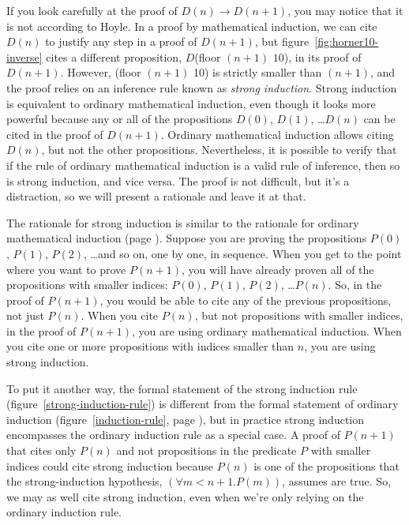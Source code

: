 If you look carefully at the proof of $D(n) \rightarrow D(n+1)$,
you may notice that it is not according to Hoyle.
In a proof by mathematical induction,
we can cite $D(n)$ to justify any step in a proof of $D(n+1)$,
but figure~\ref{fig:horner10-inverse} cites a different
proposition, $D$\textsf{(floor $(n+1)$ $10$)},
in its proof of $D(n+1)$.
However, \textsf{(floor $(n+1)$ 10)}
is strictly smaller than $(n+1)$, and
the proof relies on an inference rule
known as \emph{strong induction}.
Strong induction is equivalent to ordinary mathematical induction,
even though it looks more powerful because any or all of the
propositions $D(0)$, $D(1)$, \dots $D(n)$ can be cited in the proof of $D(n+1)$.
Ordinary mathematical induction allows citing $D(n)$, but not the other
propositions.
Nevertheless, it is possible to verify
that if the rule of ordinary mathematical induction
is a valid rule of inference, then so is strong induction, and vice versa.
The proof is not difficult, but it's a distraction,
so we will present a rationale and leave it at that.

\label{strong-induction-rationale}The rationale for
strong induction is similar to
the rationale for ordinary mathematical induction (page \pageref{induction-rationale}).
Suppose you are proving the propositions
$P(0)$, $P(1)$, $P(2)$, \dots and so on,
one by one, in sequence.
When you get to the point where you want to prove $P(n+1)$,
you will have already proven all of the propositions
with smaller indices:
$P(0)$, $P(1)$, $P(2)$, \dots $P(n)$.
So, in the proof of $P(n+1)$, you would be able to
cite any of the previous propositions, not just $P(n)$.
When you cite $P(n)$, but not propositions with smaller indices,
in the proof of $P(n+1)$, you are using ordinary mathematical induction.
When you cite one or more propositions with indices smaller than $n$,
you are using strong induction.

To put it another way, the formal statement of the strong induction rule
(figure~\ref{strong-induction-rule}) %
is different from the formal statement of ordinary induction
(figure~\ref{induction-rule}, page \pageref{induction-rule}), but
in practice strong induction encompasses the ordinary induction rule
as a special case. A proof of $P(n+1)$ that cites only $P(n)$
and not propositions in the predicate $P$ with smaller indices
could cite strong induction because $P(n)$ is one of the propositions
that the strong-induction
hypothesis, $(\forall m<n+1.P(m))$, assumes are true.
So, we may as well cite strong induction, even when we're only relying
on the ordinary induction rule.

